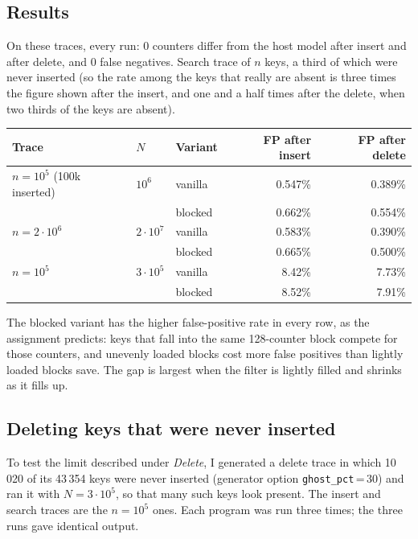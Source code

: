 \documentclass[11pt]{article}
\begin{document}
\subsection*{Results}
On these traces, every run: 0 counters differ from the host model after insert
and after delete, and 0 false negatives. Search trace of $n$ keys, a third of which were never
inserted (so the rate among the keys that really are absent is three times the
figure shown after the insert, and one and a half times after the delete,
when two thirds of the keys are absent).

\begin{center}
\begin{tabular}{lllrr}
\toprule
Trace & $N$ & Variant & FP after insert & FP after delete \\
\midrule
$n=10^5$ (100k inserted)  & $10^6$     & vanilla & 0.547\% & 0.389\% \\
                          &            & blocked & 0.662\% & 0.554\% \\
$n=2\cdot10^6$            & $2\cdot10^7$ & vanilla & 0.583\% & 0.390\% \\
                          &            & blocked & 0.665\% & 0.500\% \\
$n=10^5$                  & $3\cdot10^5$ & vanilla & 8.42\%  & 7.73\% \\
                          &            & blocked & 8.52\%  & 7.91\% \\
\bottomrule
\end{tabular}
\end{center}
The blocked variant has the higher false-positive rate in every row, as the
assignment predicts: keys that fall into the same 128-counter block compete
for those counters, and unevenly loaded blocks cost more false positives than
lightly loaded blocks save. The gap is largest when the filter is lightly
filled and shrinks as it fills up.

\subsection*{Deleting keys that were never inserted}
To test the limit described under \emph{Delete}, I generated a delete trace in
which 10\,020 of its 43\,354 keys were never inserted (generator option
\texttt{ghost\_pct}\,=\,30) and ran it with $N=3\cdot10^5$, so that many
such keys look present. The insert and search traces are the $n=10^5$ ones.
Each program was run three times; the three runs gave identical output.
\end{document}
